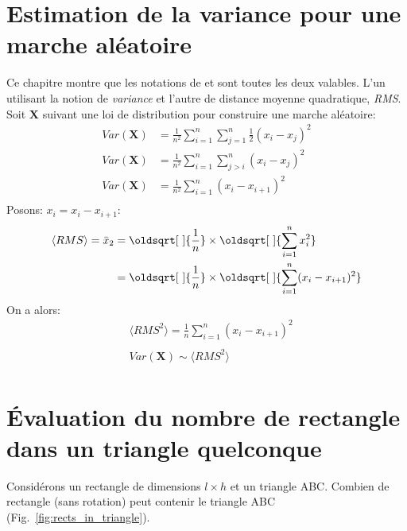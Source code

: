 \documentclass[12pt, oneside]{report}
\renewcommand*{\sqrt}[2][\ ]{\oldsqrt[#1]{#2}}
\begin{document}
\chapter*{Estimation de la variance pour une marche aléatoire}
Ce chapitre montre que les notations de \cite{Yang201445} et \cite{Gutowski2001}
sont toutes les deux valables. L’un utilisant la notion de \emph{variance} et
l’autre de distance moyenne quadratique, \emph{RMS}.\\
Soit $\mathbf{X}$ suivant une loi de distribution pour construire une marche aléatoire:
\begin{equation}
    \begin{split}
        Var(\mathbf{X}) &= \frac{1}{n^{2}} \sum_{i=1}^{n} \sum_{j=1}^{n} \frac{1}{2}(x_{i} - x_{j})^{2}\\
        Var(\mathbf{X}) &= \frac{1}{n^{2}} \sum_{i=1}^{n} \sum_{j>i}^{n} (x_{i} - x_{j})^{2}\\
        Var(\mathbf{X}) &= \frac{1}{n^{2}} \sum_{i=1}^{n} (x_{i} - x_{i+1})^{2}\\
    \end{split}
\end{equation}
Posons:  $x_{i} = x_{i} - x_{i+1}$:
\begin{equation}
    \begin{split}
        \langle RMS\rangle = \bar{x}_{2} &= \sqrt{\frac{1}{n}} \times \sqrt{\sum_{i=1}^{n}x_{i}^{2}}\\
                          &= \sqrt{\frac{1}{n}} \times \sqrt{\sum_{i=1}^{n}(x_{i} - x_{i+1})^{2}}\\
    \end{split}
\end{equation}
On a alors:
\begin{align*}
    & \langle RMS^{2}\rangle = \frac{1}{n} \sum_{i=1}^{n}(x_{i} - x_{i+1})^{2} \\\\
    & Var(\mathbf{X}) \sim \langle RMS^{2}\rangle\\
\end{align*}


\chapter*{Évaluation du nombre de rectangle dans un triangle quelconque}
Considérons un rectangle de dimensions $l \times h$ et un triangle ABC.
Combien de rectangle (sans rotation) peut contenir le triangle ABC (Fig.~\ref{fig:rects_in_triangle}).
\end{document}
